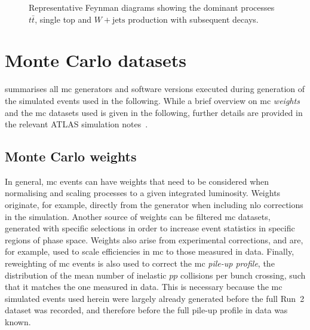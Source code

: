 \begin{figure}
\begin{subfigure}[b]{0.3\linewidth}
		\caption{\label{fig:wjets}}
	\end{subfigure}
	\caption{Representative Feynman diagrams showing the dominant processes  $t\bar{t}$,  single top and  $W+\textrm{jets}$ production with subsequent decays.}
	\label{fig:sm_backgrounds_feynman}
\end{figure}


\section{Monte Carlo datasets}

 summarises all \gls{mc} generators and software versions executed during generation of the simulated events used in the following. While a brief overview on \gls{mc} \textit{weights} and the \gls{mc} datasets used is given in the following, further details are provided in the relevant ATLAS simulation notes~\cite{ATL-PHYS-PUB-2018-009,ATL-PHYS-PUB-2016-005,ATL-PHYS-PUB-2017-006,ATL-PHYS-PUB-2017-005}.

\subsection{Monte Carlo weights}\label{sec:mc_weights}

In general, \gls{mc} events can have weights that need to be considered when normalising and scaling processes to a given integrated luminosity.
Weights originate, for example, directly from the generator when including \gls{nlo} corrections in the simulation.
Another source of weights can be filtered \gls{mc} datasets, generated with specific selections in order to increase event statistics in specific regions of phase space.
Weights also arise from experimental corrections, and are, for example, used to scale efficiencies in \gls{mc} to those measured in data. Finally, reweighting of \gls{mc} events is also used to correct the \gls{mc} \textit{pile-up profile}, \ie the distribution of the mean number of inelastic $pp$ collisions per bunch crossing, such that it matches the one measured in data.
This is necessary because the \gls{mc} simulated events used herein were largely already generated before the full Run~2 dataset was recorded, and therefore before the full pile-up profile in data was known.

